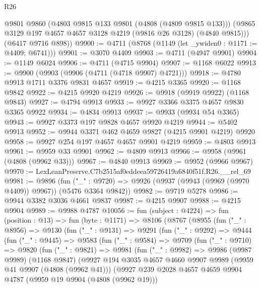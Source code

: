 \begin{lexlean}{R26}
\begin{coremodule}
        @9801
        @9860
        (@4803 @9815 @133 @9801 (@4808 (@4809 @9815 @133)))
        (@9865 @3129 @197 @4657 @4657 @3128 @4219 (@9816 @26 @3128) (@4840 @9815)))
      (@6417 @9716 @898))
@9900 := @4711 (@8768 (@1149 (let _ywiden0 : @1171 := @4409; @6741)))
@9901 := @3070 @4409
@9903 := @4711 (@4947 @9901)
@9904 := @1149 @6024
@9906 := @4711 (@4715 @9904)
@9907 := @1168 @6022
@9913 := @9900 (@9903 (@9906 (@4711 (@4718 @9907) @4721)))
@9918 := @4780 @9913 @1711 @3376 @9831 @4657
@9919 := @4215 @3365
@9920 := @1168 @9842
@9922 := @4215 @9920 @4219
@9926 := @9918 (@9919 @9922) (@1168 @9843)
@9927 := @4794 @9913
@9933 := @9927 @3366 @3375 @4657 @9830 @3365 @9922
@9934 := @4834 @9913
@9937 := @9933 (@9934 @54 @3365)
@9943 := @9927 @3373 @197 @9828 @4657 @9920 @4219
@9944 := @5402 @9913
@9952 := @9944 @3371 @462 @4659 @9827 (@4215 @9901 @4219) @9920
@9958 := @9927 @254 @197 @4657 @4657 @9901 @4219
@9959 := @4803 @9913
@9961 := @9959 @33 @9901
@9962 := @4809 @9913
@9966 := @9958 (@9961 (@4808 (@9962 @33)))
@9967 := @4840 @9913
@9969 := @9952 (@9966 @9967)
@9970 := LexLeanPreserve.C7b2515af0eddeea59726419a6840f51f.R26.__rel_69
@9981 := @9896
    (fun ("_" : @9720) => @9926 (@9937 (@9943 (@9969 (@9970 @4409)) @9967)) (@5476 @3364 @9842))
@9982 := @9719 @5278
@9986 := @9944 @3382 @3036 @4661 @9837
@9987 := @4215 @9907
@9988 := @4215 @9904
@9989 := @9988 @4787
@10056 := fun (subject : @4224) =>
  fun (position : @13) =>
  fun (byte : @1171) =>
  @8106
    (@8767
      (@8955
        (fun ("_" : @8956) =>
        @9130
          (fun ("_" : @9131) =>
          @9291
            (fun ("_" : @9292) =>
            @9444
              (fun ("_" : @9445) =>
              @9583
                (fun ("_" : @9584) =>
                @9709
                  (fun ("_" : @9710) =>
                  @9820
                    (fun ("_" : @9821) =>
                    @9981
                      (fun ("_" : @9982) =>
                      @9986
                        (@9987 @9989)
                        (@1168 @9847)
                        (@9927
                          @194
                          @3035
                          @4657
                          @4660
                          @9907
                          @9989
                          (@9959 @41 @9907 (@4808 (@9962 @41)))
                          (@9927
                            @239
                            @2028
                            @4657
                            @4659
                            @9904
                            @4787
                            (@9959 @19 @9904 (@4808 (@9962 @19)))

\end{coremodule}
\end{lexlean}
